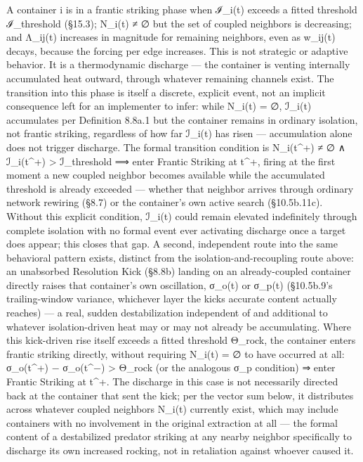 \documentclass[
]{article}
\begin{document}
A container i is in a frantic striking phase when ℐ\_i(t) exceeds a
fitted threshold ℐ\_threshold (§15.3); N\_i(t) ≠ ∅ but the set of
coupled neighbors is decreasing; and Λ\_ij(t) increases in magnitude for
remaining neighbors, even as w\_ij(t) decays, because the forcing per
edge increases. This is not strategic or adaptive behavior. It is a
thermodynamic discharge --- the container is venting internally
accumulated heat outward, through whatever remaining channels exist. The
transition into this phase is itself a discrete, explicit event, not an
implicit consequence left for an implementer to infer: while N\_i(t) =
∅, ℐ\_i(t) accumulates per Definition 8.8a.1 but the container remains
in ordinary isolation, not frantic striking, regardless of how far
ℐ\_i(t) has risen --- accumulation alone does not trigger discharge. The
formal transition condition is N\_i(t\^{}+) ≠ ∅ ∧ ℐ\_i(t\^{}+)
\textgreater{} ℐ\_threshold ⟹ enter Frantic Striking at t\^{}+, firing
at the first moment a new coupled neighbor becomes available while the
accumulated threshold is already exceeded --- whether that neighbor
arrives through ordinary network rewiring (§8.7) or the container's own
active search (§10.5b.11c). Without this explicit condition, ℐ\_i(t)
could remain elevated indefinitely through complete isolation with no
formal event ever activating discharge once a target does appear; this
closes that gap. A second, independent route into the same behavioral
pattern exists, distinct from the isolation-and-recoupling route above:
an unabsorbed Resolution Kick (§8.8b) landing on an already-coupled
container directly raises that container's own oscillation, σ\_o(t) or
σ\_p(t) (§10.5b.9's trailing-window variance, whichever layer the kicks
accurate content actually reaches) --- a real, sudden destabilization
independent of and additional to whatever isolation-driven heat may or
may not already be accumulating. Where this kick-driven rise itself
exceeds a fitted threshold Θ\_rock, the container enters frantic
striking directly, without requiring N\_i(t) = ∅ to have occurred at
all: σ\_o(t\^{}+) − σ\_o(t\^{}−) \textgreater{} Θ\_rock (or the
analogous σ\_p condition) ⇒ enter Frantic Striking at t\^{}+. The
discharge in this case is not necessarily directed back at the container
that sent the kick; per the vector sum below, it distributes across
whatever coupled neighbors N\_i(t) currently exist, which may include
containers with no involvement in the original extraction at all --- the
formal content of a destabilized predator striking at any nearby
neighbor specifically to discharge its own increased rocking, not in
retaliation against whoever caused it.
\end{document}
